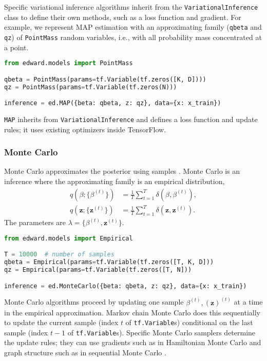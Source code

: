 Specific variational inference algorithms inherit from
the \texttt{VariationalInference} class to define their own methods, such as a
loss function and gradient.
For example, we represent
MAP
estimation with an approximating family (\texttt{qbeta} and
\texttt{qz}) of \texttt{PointMass} random variables, i.e., with all
probability mass concentrated at a point.
\begin{lstlisting}[language=Python]
from edward.models import PointMass

qbeta = PointMass(params=tf.Variable(tf.zeros([K, D])))
qz = PointMass(params=tf.Variable(tf.zeros(N)))

inference = ed.MAP({beta: qbeta, z: qz}, data={x: x_train})
\end{lstlisting}
\texttt{MAP} inherits from \texttt{VariationalInference} and defines a
loss function and update rules; it uses existing optimizers inside
TensorFlow.

\subsubsection{Monte Carlo}

Monte Carlo approximates the posterior using samples
\citep{robert1999monte}. Monte Carlo is an inference where the
approximating family is an empirical distribution,
\begin{align*}
q(\beta; \{\beta^{(t)}\})
&= \frac{1}{T}\sum_{t=1}^T \delta(\beta, \beta^{(t)}), \\[1.5ex]
q(\mathbf{z}; \{\mathbf{z}^{(t)}\})
&= \frac{1}{T}\sum_{t=1}^T \delta(\mathbf{z}, \mathbf{z}^{(t)}).
\end{align*}
The parameters are $\lambda=\{\beta^{(t)},\mathbf{z}^{(t)}\}$.
\begin{lstlisting}[language=Python]
from edward.models import Empirical

T = 10000  # number of samples
qbeta = Empirical(params=tf.Variable(tf.zeros([T, K, D]))
qz = Empirical(params=tf.Variable(tf.zeros([T, N]))

inference = ed.MonteCarlo({beta: qbeta, z: qz}, data={x: x_train})
\end{lstlisting}
Monte Carlo algorithms proceed by updating one sample
$\beta^{(t)},\mathbf{(z)}^{(t)}$ at a time in the empirical approximation.
%
Markov chain Monte Carlo does this sequentially to update
the current sample (index $t$ of \texttt{tf.Variable}s) conditional on
the last sample (index $t-1$ of \texttt{tf.Variable}s).
%
Specific Monte Carlo samplers determine the update rules;
they can use gradients such as in Hamiltonian Monte Carlo
\citep{neal2011mcmc} and graph
structure such as in sequential Monte Carlo \citep{doucet2001introduction}.

